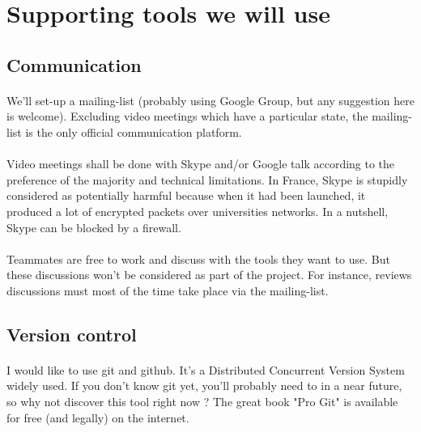 \section{Supporting tools we will use}

\subsection{Communication}

\paragraph{} We'll set-up a mailing-list (probably using Google Group, but any
suggestion here is welcome). Excluding video meetings which have a particular
state, the mailing-list is the only official communication platform.

\paragraph{} Video meetings shall be done with Skype and/or Google talk
according to the preference of the majority and technical limitations. In France,
Skype is stupidly considered as potentially harmful because when it had been
launched, it produced a lot of encrypted packets over universities networks.
In a nutshell, Skype can be blocked by a firewall.

\paragraph{} Teammates are free to work and discuss with the tools they want to
use. But these discussions won't be considered as part of the project. For
instance, reviews discussions must most of the time take place via the
mailing-list.

\subsection{Version control}

\paragraph{} I would like to use git and github. It's a Distributed Concurrent
Version System widely used. If you don't know git yet, you'll probably need to
in a near future, so why not discover this tool right now ? The great book "Pro
Git" is available for free (and legally) on the internet.

